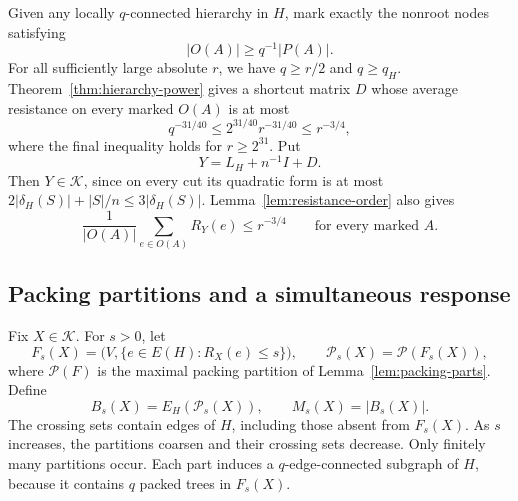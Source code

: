 Given any locally \(q\)-connected hierarchy in \(H\), mark exactly
the nonroot nodes satisfying
\[
 |O(A)|\ge q^{-1}|P(A)|.
\]
For all sufficiently large absolute \(r\), we have \(q\ge r/2\)
and \(q\ge q_H\). Theorem~\ref{thm:hierarchy-power} gives a shortcut
matrix \(D\) whose average resistance on every marked \(O(A)\) is
at most
\[
 q^{-31/40}\le2^{31/40}r^{-31/40}\le r^{-3/4},
\]
where the final inequality holds for \(r\ge2^{31}\). Put
\begin{equation}\label{eq:hierarchy-response}
 Y=L_H+n^{-1}I+D.
\end{equation}
Then \(Y\in\mathcal K\), since on every cut its quadratic form is
at most \(2|\delta_H(S)|+|S|/n\le3|\delta_H(S)|\).
Lemma~\ref{lem:resistance-order} also gives
\begin{equation}\label{eq:response-average}
 \frac1{|O(A)|}\sum_{e\in O(A)}R_Y(e)\le r^{-3/4}
 \qquad\text{for every marked }A.
\end{equation}

\subsection{Packing partitions and a simultaneous response}

Fix \(X\in\mathcal K\). For \(s>0\), let
\[
 F_s(X)=\bigl(V,\{e\in E(H):R_X(e)\le s\}\bigr),
 \qquad
 \mathcal P_s(X)=\mathcal P(F_s(X)),
\]
where \(\mathcal P(F)\) is the maximal packing partition of
Lemma~\ref{lem:packing-parts}. Define
\[
 B_s(X)=E_H(\mathcal P_s(X)),\qquad M_s(X)=|B_s(X)|.
\]
The crossing sets contain edges of \(H\), including those absent
from \(F_s(X)\).
As \(s\) increases, the partitions coarsen and their crossing sets
decrease. Only finitely many partitions occur.
Each part induces a \(q\)-edge-connected subgraph of \(H\),
because it contains \(q\) packed trees in \(F_s(X)\).

